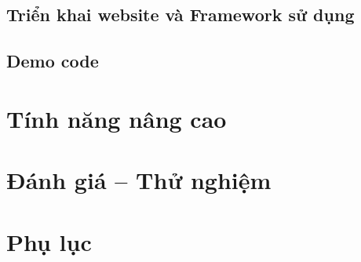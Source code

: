 \documentclass[a4paper]{report}
\begin{document}
\section{Triển khai website và Framework sử dụng}


\section{Demo code}


\chapter{Tính năng nâng cao}
\label{chap:advanced}


\chapter{Đánh giá -- Thử nghiệm}
\label{chap:eval}


\chapter*{Phụ lục}


\end{document}
